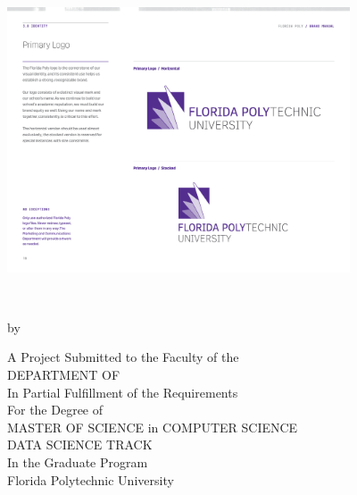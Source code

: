 %
%
%

\begin{center} 
    \includegraphics[width=4in]{Content/Images/FLPoly_logo.pdf}\\\vspace*{25mm}
	{{\bfseries\large{\MakeUppercase{\thesisTitle} \\}}\par}
	\vspace*{15mm}
	{by\\\vspace*{2mm}\textsc{\thesisBy}\par}
	\vspace*{15mm}
	A Project Submitted to the Faculty of the \\
	DEPARTMENT OF {\MakeUppercase{\thesisDegreeDepartment}}\\
	In Partial Fulfillment of the Requirements\\
	For the Degree of\\
	MASTER OF SCIENCE in COMPUTER SCIENCE\\
	DATA SCIENCE TRACK\\ 
	In the Graduate Program\\\vspace*{1.5mm}
	Florida Polytechnic University\\\vspace*{10mm}
	\small \thesisDate \\\vspace*{1.5mm}
	\vfill
    ~
\end{center}
\pagebreak